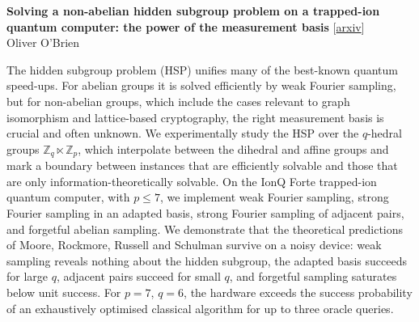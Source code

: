 \documentclass[12pt,letterpaper]{article}
\begin{document}
{\small\textbf{Solving a non-abelian hidden subgroup problem on a trapped-ion quantum computer: the power of the measurement basis}} {\scriptsize[\href{https://arxiv.org/abs/2611.06716}{arxiv}]}\nopagebreak\\
{\scriptsize Oliver O'Brien}\nopagebreak\\[2pt]
{\footnotesize The hidden subgroup problem (HSP) unifies many of the best-known quantum speed-ups. For abelian groups it is solved efficiently by weak Fourier sampling, but for non-abelian groups, which include the cases relevant to graph isomorphism and lattice-based cryptography, the right measurement basis is crucial and often unknown. We experimentally study the HSP over the $q$-hedral groups $\mathbb{Z}_q \ltimes \mathbb{Z}_p$, which interpolate between the dihedral and affine groups and mark a boundary between instances that are efficiently solvable and those that are only information-theoretically solvable. On the IonQ Forte trapped-ion quantum computer, with $p \le 7$, we implement weak Fourier sampling, strong Fourier sampling in an adapted basis, strong Fourier sampling of adjacent pairs, and forgetful abelian sampling. We demonstrate that the theoretical predictions of Moore, Rockmore, Russell and Schulman survive on a noisy device: weak sampling reveals nothing about the hidden subgroup, the adapted basis succeeds for large $q$, adjacent pairs succeed for small $q$, and forgetful sampling saturates below unit success. For $p=7$, $q=6$, the hardware exceeds the success probability of an exhaustively optimised classical algorithm for up to three oracle queries.\par}
\medskip
\end{document}
